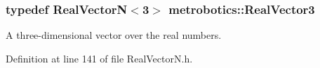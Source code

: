 \hypertarget{namespacemetrobotics_ae3d5d1be736febeba32fbed64b429007}{
\subsubsection[{\-Real\-Vector3}]{\setlength{\rightskip}{0pt plus 5cm}typedef {\bf \-Real\-Vector\-N}$<$3$>$ {\bf metrobotics\-::\-Real\-Vector3}}}\label{namespacemetrobotics_ae3d5d1be736febeba32fbed64b429007}


\-A three-\/dimensional vector over the real numbers. 



\-Definition at line 141 of file \-Real\-Vector\-N.\-h.

